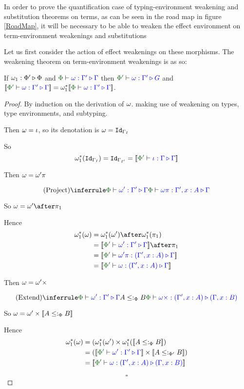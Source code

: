 \documentclass{Report}
\begin{document}
In order to prove the quantification case of typing-environment weakening and substitution theorems on terms, as can be seen in the road map in figure \ref{RoadMap}, it will be necessary to be able to weaken the effect environment on term-environment weakenings and substitutions

Let us first consider the action of effect weakenings on these morphisms. The weakening theorem on term-environment weakenings is as so:


\begin{theorem}
    If $\omega_1 : \Phi' \triangleright \Phi$ and $\pewrel{\w}{\G'}{\G}$ then $\ewrel{\P'}{\w}{\G'}{G}$ and $\deno{\ewrel{\P'}{\w}{\G'}{\G}} = \w_1\star\deno{\pewrel{\w}{\G'}{\G}}$.
\end{theorem}

\begin{proof}
    By induction on the derivation of $\omega$. making use of weakening on types, type environments, and subtyping.

    Then $\omega = \iota$, so its denotation is $\omega = \texttt{Id}_{\Gamma_I}$
    
    So
    \begin{equation}
      \w_1\star(\Id{\G_I}) = \Id{\G_{I'}} = \deno{\ewrel{\P'}{\i}{\G}{\G}}  
    \end{equation}
    
    Then $\omega = \omega'\pi$
    
    \begin{equation}
        \ntreeruleI{Project}{\ewrel{\P}{\w'}{\G'}{\G}}{\ewrel{\P}{\w\pi}{\G',x:A}{\G}}
    \end{equation}
    
    So $\w = \w'\after\p$
    
    Hence
    \begin{align*}
        \w_1\star(\w) &= \w_1\star(\w')\after\w_1\star(\p)\\
        & = \deno{\ewrel{\P'}{\w'}{\G'}{\G}}\after\p\\
        & = \deno{\ewrel{\P'}{\w'\pi}{(\G',x:A)}{\G}}\\
        & = \deno{\ewrel{\P'}{\w}{(\G', x:A)}{\G}}
    \end{align*}
    
    Then $\omega = \omega'\times$
    
    \begin{equation}
        \ntreeruleII{Extend}{\ewrel{\P}{\w'}{\G'}{\G}}{A\subtypep B}{\ewrel{\P}{\w\x}{(\G',x:A)}{(\G, x:B)}}
    \end{equation}
    
    So $\omega = \omega'\times{\bf [\![}A\leq:_\Phi B{\bf ]\!]}$
    
    Hence
    \begin{align*}
        \w_1\star(\w) &=(\w_1\star(\w')\times\w_1\star(\deno{A\subtypep B})\\
        & = (\deno{\ewrel{\P'}{\w'}{\G'}{\G}}\times\deno{A\subtypepp B})\\
        & = \deno{\ewrel{\P'}{\w}{(\G',x:A)}{(\G,x:B)}}
    \end{align*}

    $$\square$$
\end{proof}
\end{document}
